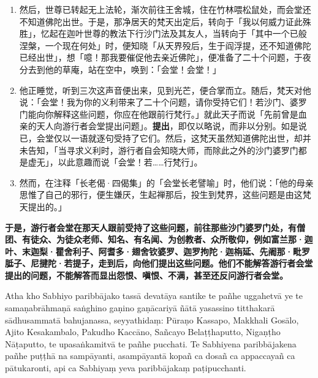 \begin{enumerate}
\item 然后，世尊已转起无上法轮，渐次前往王舍城，住在竹林喂松鼠处，而会堂还不知道佛陀出世。于是，那净居天的梵天出定后，转向于「我以何威力证此殊胜」，忆起在迦叶世尊的教法下行沙门法及其友人，当转向于「其中一个已般涅槃，一个现在何处」时，便知晓「从天界殁后，生于阎浮提，还不知道佛陀已经出世」，想「噫！那我要催促他去亲近佛陀」，便准备了二十个问题，于夜分去到他的草庵，站在空中，唤到：「会堂！会堂！」
\item 他正睡觉，听到三次这声音便出来，见到光芒，便合掌而立。随后，梵天对他说：「会堂！我为你的义利带来了二十个问题，请你受持它们！若沙门、婆罗门能向你解释这些问题，你应在他跟前行梵行。」就此天子而说「先前曾是血亲的天人向游行者会堂提出问题」。\textbf{提出}，即仅以略说，而非以分别。如是说已，会堂仅以一语就逐句受持了它们。然后，这梵天虽然知道佛陀出世，却并未告知，「当寻求义利时，游行者自会知晓大师，而除此之外的沙门婆罗门都是虚无」，以此意趣而说「会堂！若……行梵行」。
\item 然而，在注释「长老偈·四偈集」的「会堂长老譬喻」时，他们说：「他的母亲思惟了自己的邪行，便生嫌厌，生起禅那后，投生到梵界，这些问题是由这梵天提出的。」\end{enumerate}

\textbf{于是，游行者会堂在那天人跟前受持了这些问题，前往那些沙门婆罗门处，有僧团、有徒众、为徒众老师、知名、有名闻、为创教者、众所敬仰，例如富兰那·迦叶、末迦梨·瞿舍利子、阿耆多·翅舍钦婆罗、迦罗拘陀·迦栴延、先阇那·毗罗胝子、尼揵陀·若提子，走到后，向他们提出这些问题。他们不能解答游行者会堂提出的问题，不能解答而显出怨恨、嗔恨、不满，甚至还反问游行者会堂。}

Atha kho Sabhiyo paribbājako tassā devatāya santike te pañhe uggahetvā ye te samaṇabrāhmaṇā saṅghino gaṇino gaṇācariyā ñātā yasassino titthakarā sādhusammatā bahujanassa, seyyathidaṃ: Pūraṇo Kassapo, Makkhali Gosālo, Ajito Kesakambalo, Pakudho Kaccāno, Sañcayo Belaṭṭhaputto, Nigaṇṭho Nāṭaputto, te upasaṅkamitvā te pañhe pucchati. Te Sabhiyena paribbājakena pañhe puṭṭhā na sampāyanti, asampāyantā kopañ ca dosañ ca appaccayañ ca pātukaronti, api ca Sabhiyaṃ yeva paribbājakaṃ paṭipucchanti.

